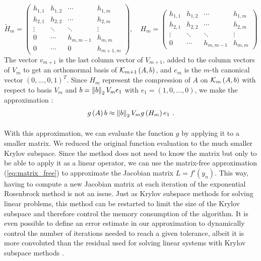       \begin{equation}
        \tilde{H}_m = \begin{pmatrix}
          h_{1,1} & h_{1,2} & \cdots    & h_{1,m} \\
          h_{2,1} & h_{2,2} & \cdots    & h_{2,m} \\
          \vdots  & \ddots  & \ddots    & \vdots  \\
          0       & \cdots  & h_{m,m-1} & h_{m,m} \\
          0       & \cdots  & 0         & h_{m+1,m}
        \end{pmatrix} , \quad H_m = \begin{pmatrix}
          h_{1,1} & h_{1,2} & \cdots    & h_{1,m} \\
          h_{2,1} & h_{2,2} & \cdots    & h_{2,m} \\
          \vdots  & \ddots  & \ddots    & \vdots  \\
          0       & \cdots  & h_{m,m-1} & h_{m,m}
        \end{pmatrix}
      \end{equation}
      The vector $v_{m+1}$ is the last column vector of $V_{m+1}$, added to the column vectors of $V_m$ to get an orthonormal basis of $\krylov[A, b]{m+1}$, and $e_m$ is the $m$-th canonical vector $\left(0, \dots, 0, 1\right)^T$.
      Since $H_m$ represent the compression of $A$ on $\krylov[A, b]{m}$ with respect to basis $V_m$ and $b = \norm[2]{b} V_m e_1$ with $e_1 = \left(1, 0, \dots, 0\right)$, we make the approximation \cite{EiermannErnst2006}:
      \begin{equation}
        g\left(A\right)b \approx \norm[2]{b} V_m g\left(H_m\right) e_1 \ .
      \end{equation}

      \paragraph{}
      With this approximation, we can evaluate the function $g$ by applying it to a smaller matrix.
      We reduced the original function evaluation to the much smaller Krylov subspace.
      Since the method does not need to know the matrix but only to be able to apply it as a linear operator, we can use the matrix-free approximation (\ref{eq:matrix_free}) to approximate the Jacobian matrix $L = f'\left(y_n\right)$.
      This way, having to compute a new Jacobian matrix at each iteration of the exponential Rosenbrock method is not an issue.
      Just as Krylov subspace methods for solving linear problems, this method can be restarted to limit the size of the Krylov subspace and therefore control the memory consumption of the algorithm.
      It is even possible to define an error estimate in our approximation to dynamically control the number of iterations needed to reach a given tolerance, albeit it is more convoluted than the residual used for solving linear systems with Krylov subspace methods \cite{EiermannErnst2006}.

